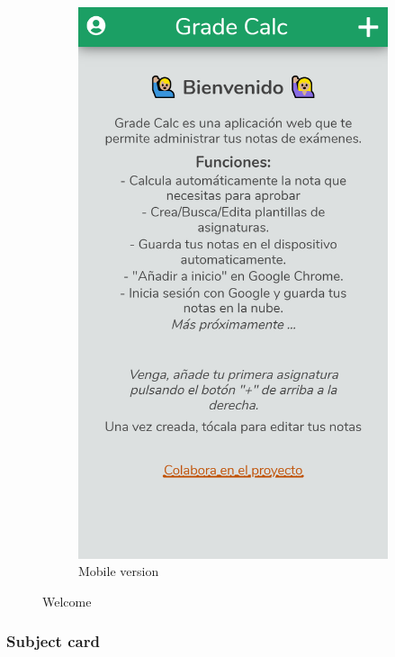 \begin{figure}[ht!]
\begin{subfigure}[b]{0.243\textwidth-0.1cm}
        \includegraphics[width=\textwidth]{media/screenshots/screenshot-tutorial.png}
        \caption{Mobile version}
    \end{subfigure}
    \caption{Welcome}
    \label{fig:welcome}
\end{figure}
\vfill

\clearpage\newpage
\subsubsection{Subject card}
\label{sec:subject-card}

